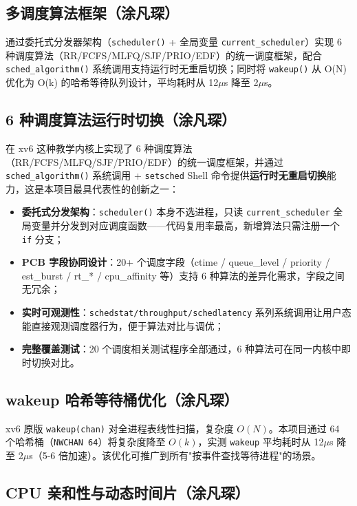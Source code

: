 \documentclass[12pt,a4paper]{ctexart}
\begin{document}
\subsection{多调度算法框架（涂凡琛）}

通过委托式分发器架构（\texttt{scheduler()} + 全局变量 \texttt{current\_scheduler}）实现 6 种调度算法（RR/FCFS/MLFQ/SJF/PRIO/EDF）的统一调度框架，配合 \texttt{sched\_algorithm()} 系统调用支持运行时无重启切换；同时将 \texttt{wakeup()} 从 O(N) 优化为 O(k) 的哈希等待队列设计，平均耗时从 12$\mu$s 降至 2$\mu$s。

\subsection{6 种调度算法运行时切换（涂凡琛）}

在 xv6 这种教学内核上实现了 6 种调度算法（RR/FCFS/MLFQ/SJF/PRIO/EDF）的统一调度框架，并通过 \texttt{sched\_algorithm()} 系统调用 + \texttt{setsched} Shell 命令提供\textbf{运行时无重启切换}能力，这是本项目最具代表性的创新之一：

\begin{itemize}
  \item \textbf{委托式分发架构}：\texttt{scheduler()} 本身不选进程，只读 \texttt{current\_scheduler} 全局变量并分发到对应调度函数——代码复用率最高，新增算法只需注册一个 \texttt{if} 分支；
  \item \textbf{PCB 字段协同设计}：20+ 个调度字段（ctime / queue\_level / priority / est\_burst / rt\_* / cpu\_affinity 等）支持 6 种算法的差异化需求，字段之间无冗余；
  \item \textbf{实时可观测性}：\texttt{schedstat/throughput/schedlatency} 系列系统调用让用户态能直接观测调度器行为，便于算法对比与调优；
  \item \textbf{完整覆盖测试}：20 个调度相关测试程序全部通过，6 种算法可在同一内核中即时切换对比。
\end{itemize}

\subsection{wakeup 哈希等待桶优化（涂凡琛）}

xv6 原版 \texttt{wakeup(chan)} 对全进程表线性扫描，复杂度 $O(N)$。本项目通过 64 个哈希桶（\texttt{NWCHAN 64}）将复杂度降至 $O(k)$，实测 \texttt{wakeup} 平均耗时从 12$\mu$s 降至 2$\mu$s（5-6 倍加速）。该优化可推广到所有"按事件查找等待进程"的场景。

\subsection{CPU 亲和性与动态时间片（涂凡琛）}
\end{document}
